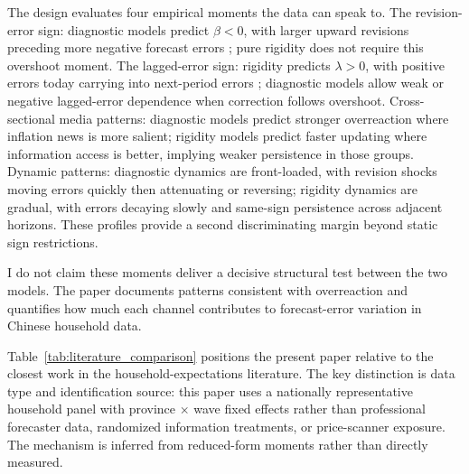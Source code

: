The design evaluates four empirical moments the data can speak to.
The revision-error sign: diagnostic models predict $\beta<0$, with
larger upward revisions preceding more negative forecast errors
\citep{Bordalo2020b}; pure rigidity does not require this overshoot
moment.
The lagged-error sign: rigidity predicts $\lambda>0$, with positive
errors today carrying into next-period errors \citep{Coibion2015};
diagnostic models allow weak or negative lagged-error dependence when
correction follows overshoot.
Cross-sectional media patterns: diagnostic models predict stronger
overreaction where inflation news is more salient; rigidity models
predict faster updating where information access is better, implying
weaker persistence in those groups.
Dynamic patterns: diagnostic dynamics are front-loaded, with revision
shocks moving errors quickly then attenuating or reversing; rigidity
dynamics are gradual, with errors decaying slowly and same-sign
persistence across adjacent horizons. These profiles provide a second
discriminating margin beyond static sign restrictions.

I do not claim these moments deliver a decisive structural test between the two
models. The paper documents patterns consistent with overreaction and quantifies
how much each channel contributes to forecast-error variation in Chinese
household data.

Table~\ref{tab:literature_comparison} positions the present paper
relative to the closest work in the household-expectations literature.
The key distinction is data type and identification source: this paper
uses a nationally representative household panel with province $\times$
wave fixed effects rather than professional forecaster data, randomized
information treatments, or price-scanner exposure. The mechanism is
inferred from reduced-form moments rather than directly measured.



